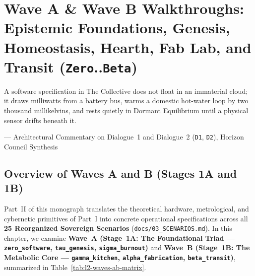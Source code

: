 \chapter{Wave A \& Wave B Walkthroughs: Epistemic Foundations, Genesis, Homeostasis, Hearth, Fab Lab, and Transit (\texttt{Zero}..\texttt{Beta})}
\label{ch:waves-a-and-b-walkthroughs}

\epigraph{A software specification in The Collective does not float in an immaterial cloud; it draws milliwatts from a battery bus, warms a domestic hot-water loop by two thousand millikelvins, and rests quietly in Dormant Equilibrium until a physical sensor drifts beneath it.}{--- Architectural Commentary on Dialogue~1 and Dialogue~2 (\texttt{D1}, \texttt{D2}), Horizon Council Synthesis}

\section{Overview of Waves A and B (Stages 1A and 1B)}
\label{sec:l2-waves-ab-overview}

Part~II of this monograph translates the theoretical hardware, metrological, and cybernetic primitives of Part~I into concrete operational specifications across all \textbf{25 Reorganized Sovereign Scenarios} (\texttt{docs/03\_SCENARIOS.md}). In this chapter, we examine \textbf{Wave~A (Stage~1A: The Foundational Triad --- \texttt{zero\_software}, \texttt{tau\_genesis}, \texttt{sigma\_burnout})} and \textbf{Wave~B (Stage~1B: The Metabolic Core --- \texttt{gamma\_kitchen}, \texttt{alpha\_fabrication}, \texttt{beta\_transit})}, summarized in Table~\ref{tab:l2-waves-ab-matrix}.

